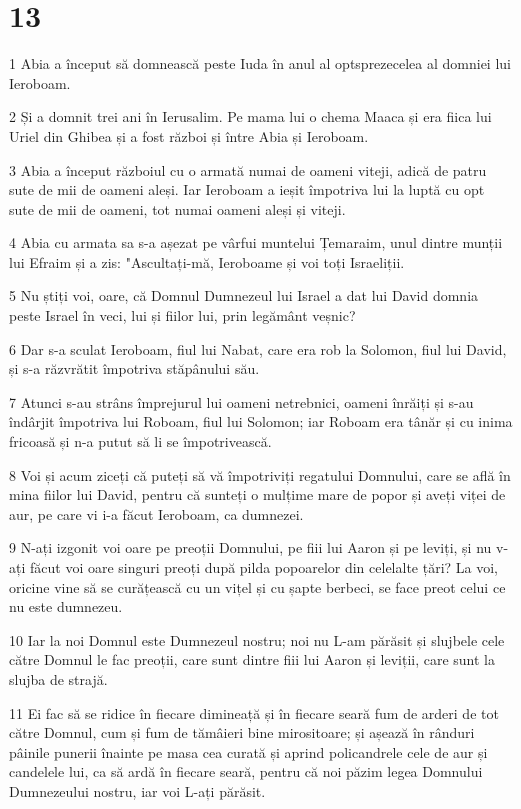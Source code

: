 \chapter{13}

\par 1 Abia a început să domnească peste Iuda în anul al optsprezecelea al domniei lui Ieroboam.
\par 2 Și a domnit trei ani în Ierusalim. Pe mama lui o chema Maaca și era fiica lui Uriel din Ghibea și a fost război și între Abia și Ieroboam.
\par 3 Abia a început războiul cu o armată numai de oameni viteji, adică de patru sute de mii de oameni aleși. Iar Ieroboam a ieșit împotriva lui la luptă cu opt sute de mii de oameni, tot numai oameni aleși și viteji.
\par 4 Abia cu armata sa s-a așezat pe vârfui muntelui Țemaraim, unul dintre munții lui Efraim și a zis: "Ascultați-mă, Ieroboame și voi toți Israeliții.
\par 5 Nu știți voi, oare, că Domnul Dumnezeul lui Israel a dat lui David domnia peste Israel în veci, lui și fiilor lui, prin legământ veșnic?
\par 6 Dar s-a sculat Ieroboam, fiul lui Nabat, care era rob la Solomon, fiul lui David, și s-a răzvrătit împotriva stăpânului său.
\par 7 Atunci s-au strâns împrejurul lui oameni netrebnici, oameni înrăiți și s-au îndârjit împotriva lui Roboam, fiul lui Solomon; iar Roboam era tânăr și cu inima fricoasă și n-a putut să li se împotrivească.
\par 8 Voi și acum ziceți că puteți să vă împotriviți regatului Domnului, care se află în mina fiilor lui David, pentru că sunteți o mulțime mare de popor și aveți viței de aur, pe care vi i-a făcut Ieroboam, ca dumnezei.
\par 9 N-ați izgonit voi oare pe preoții Domnului, pe fiii lui Aaron și pe leviți, și nu v-ați făcut voi oare singuri preoți după pilda popoarelor din celelalte țări? La voi, oricine vine să se curățească cu un vițel și cu șapte berbeci, se face preot celui ce nu este dumnezeu.
\par 10 Iar la noi Domnul este Dumnezeul nostru; noi nu L-am părăsit și slujbele cele către Domnul le fac preoții, care sunt dintre fiii lui Aaron și leviții, care sunt la slujba de strajă.
\par 11 Ei fac să se ridice în fiecare dimineață și în fiecare seară fum de arderi de tot către Domnul, cum și fum de tămâieri bine mirositoare; și așează în rânduri pâinile punerii înainte pe masa cea curată și aprind policandrele cele de aur și candelele lui, ca să ardă în fiecare seară, pentru că noi păzim legea Domnului Dumnezeului nostru, iar voi L-ați părăsit.
